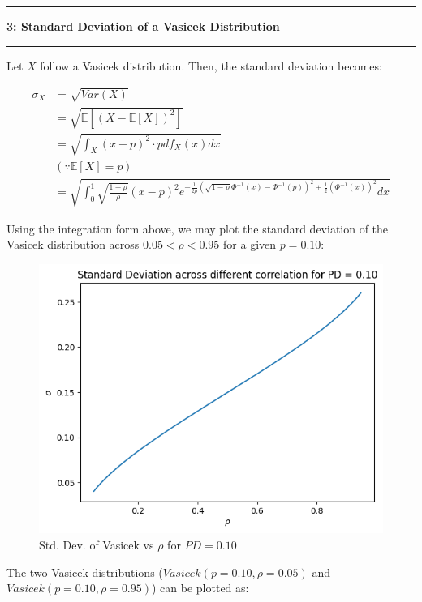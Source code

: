 \documentclass[11pt]{article}
\newcommand\question[2]{\vspace{.25in}\hrule\textbf{#1: #2}\vspace{.5em}\hrule\vspace{.10in}}
\newcommand{\Exp}{\mathbb{E}}
\begin{document}
\newpage

\question{3}{Standard Deviation of a Vasicek Distribution}

Let $X$ follow a Vasicek distribution. Then, the standard deviation
becomes:

$$
\begin{aligned}
\sigma_X &= \sqrt{Var(X)} \\
&= \sqrt{\Exp[\left(X - \Exp[X] \right)^2]} \\
&= \sqrt{
\int_X (x - p)^2 \cdot pdf_X(x) dx} \\
&(\because \Exp[X] = p) \\
&= \sqrt{
\int_0^1 \sqrt{\frac{1 - \rho}{\rho}} (x - p)^2 
e^{
-\frac{1}{2 \rho} \left(
\sqrt{1 - \rho} \Phi^{-1}(x) - \Phi^{-1}(p)
\right)^2
+ \frac{1}{2} \left(
\Phi^{-1}(x)
\right)^2
} dx}
\end{aligned}
$$

Using the integration form above, we may plot the standard deviation
of the Vasicek distribution across $0.05 < \rho < 0.95$ for a
given $p = 0.10$:

\begin{figure}[h]
\centering
\includegraphics[scale=0.8]{Q3-1.png}
\caption{Std. Dev. of Vasicek vs $\rho$ for $PD = 0.10$}
\label{Fig:Q3-1}
\end{figure}

\newpage

The two Vasicek distributions ($Vasicek(p = 0.10, \rho = 0.05)$ and
$Vasicek(p = 0.10, \rho = 0.95)$) can be plotted as:
\end{document}
